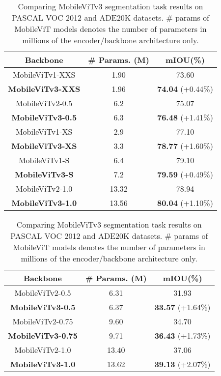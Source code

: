\documentclass{article} \usepackage{iclr2022_conference,times}
\begin{document}
\begin{table}[!htb]
    \begin{subtable}[c]{0.5\textwidth}
    \scriptsize
    \centering
        \begin{tabular}{ccc}
        \toprule 
        {Backbone} & {\# Params. (M) }& {mIOU(\%) } \\ 
        \midrule
        MobileViTv1-XXS  & 1.90 & 73.60 \\
        \textbf{MobileViTv3-XXS}  & 1.96 & \textbf{74.04} (+0.44\%)   \\
        \midrule
        MobileViTv2-0.5  & 6.2 & 75.07   \\
        \textbf{MobileViTv3-0.5}  & 6.3 & \textbf{76.48} (+1.41\%)   \\
        \midrule
        MobileViTv1-XS  & 2.9 & 77.10 \\
        \textbf{MobileViTv3-XS}  & 3.3 & \textbf{78.77} (+1.60\%)   \\
        \midrule
MobileViTv1-S  & 6.4 & 79.10 \\
        \textbf{MobileViTv3-S}  & 7.2 & \textbf{79.59} (+0.49\%)   \\
        \midrule
        MobileViTv2-1.0  & 13.32 & 78.94\\
        \textbf{MobileViTv3-1.0}  & 13.56 & \textbf{80.04} (+1.10\%)   \\
        \bottomrule
        \end{tabular}
        \label{table:segpascal}
    \end{subtable}
    \begin{subtable}[c]{0.5\textwidth}
    \scriptsize
    \centering
        \begin{tabular}{ccc}
        \toprule 
        {Backbone} & {\# Params. (M) }& {mIOU(\%) } \\ 
        \midrule
        MobileViTv2-0.5  & 6.31 & 31.93  \\
\textbf{MobileViTv3-0.5}  & 6.37 & \textbf{33.57} (+1.64\%)  \\
        \midrule
        MobileViTv2-0.75  & 9.60 & 34.70 \\
\textbf{MobileViTv3-0.75}  & 9.71 & \textbf{36.43} (+1.73\%)   \\
        
        \midrule
MobileViTv2-1.0  & 13.40 & 37.06 \\
\textbf{MobileViTv3-1.0} & 13.62 & \textbf{39.13} (+2.07\%)   \\
        \bottomrule
        \end{tabular}
        \label{table:segade20k}
    \end{subtable}
\caption{Comparing MobileViTv3 segmentation task results on PASCAL VOC 2012 and ADE20K datasets. \# params of MobileViT models denotes the number of parameters in millions of the encoder/backbone architecture only.}
\end{table}
\end{document}
